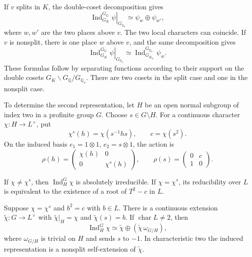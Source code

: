 If $v$ splits in $K$, the double-coset decomposition gives
\[
 \left.\operatorname{Ind}_{G_K}^{G_{\mathbb Q}}\psi\right|_{G_{\mathbb Q_v}}
 \simeq \psi_w\oplus\psi_{w'},
\]
where $w,w'$ are the two places above $v$. The two local characters
can coincide. If $v$ is nonsplit, there is one place $w$ above $v$,
and the same decomposition gives
\[
 \left.\operatorname{Ind}_{G_K}^{G_{\mathbb Q}}\psi\right|_{G_{\mathbb Q_v}}
 \simeq\operatorname{Ind}_{G_{K_w}}^{G_{\mathbb Q_v}}\psi_w.
\]
These formulas follow by separating functions according to their support
on the double cosets $G_K\backslash G_{\mathbb Q}/G_{\mathbb Q_v}$.
There are two cosets in the split case and one in the nonsplit case.

To determine the second representation, let $H$ be an open normal
subgroup of index two in a profinite group $G$. Choose $s\in G\setminus H$.
For a continuous character $\chi:H\to L^\times$, put
\[
 \chi^s(h)=\chi(s^{-1}hs),\qquad c=\chi(s^2).
\]
On the induced basis $e_1=1\otimes1$, $e_2=s\otimes1$, the action is
\begin{equation}
\label{v4-arith:quadratic-local:matrices}
 \rho(h)=\begin{pmatrix}\chi(h)&0\\0&\chi^s(h)\end{pmatrix},
 \qquad
 \rho(s)=\begin{pmatrix}0&c\\1&0\end{pmatrix}.
\end{equation}

\begin{proposition}
\label{v4-arith:quadratic-local:criterion}
If $\chi\ne\chi^s$, then $\operatorname{Ind}_H^G\chi$ is absolutely
irreducible. If $\chi=\chi^s$, its reducibility over $L$ is equivalent
to the existence of a root of $T^2-c$ in $L$.

Suppose $\chi=\chi^s$ and $b^2=c$ with $b\in L$. There is a continuous
extension $\widetilde\chi:G\to L^\times$ with
$\widetilde\chi|_H=\chi$ and $\widetilde\chi(s)=b$.
If $\operatorname{char}L\ne2$, then
\[
 \operatorname{Ind}_H^G\chi
 \simeq\widetilde\chi\oplus(\widetilde\chi\,\omega_{G/H}),
\]
where $\omega_{G/H}$ is trivial on $H$ and sends $s$ to $-1$.
In characteristic two the induced representation is a nonsplit
self-extension of $\widetilde\chi$.
\end{proposition}


